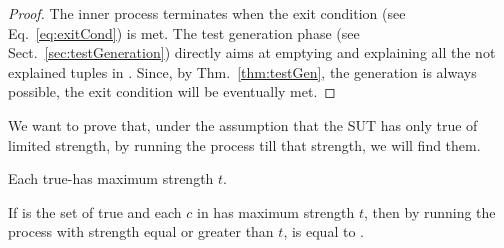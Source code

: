 \begin{tikzborder}{\cite{Gargantini16:validation}}
\begin{tikzborder}{\cite{gargantini_combinatorial_2017}}
\begin{tikzborder}{\cite{gargantini_combinatorial_2017}}
\begin{tikzborder}{\cite{garn2019}}
\begin{tikzborder}{\cite{arcaini2019achieving}}
\begin{tikzborder}{}
\begin{proof}
	The inner process \mixt terminates when the exit condition (see Eq.~\ref{eq:exitCond}) is met. The test generation phase (see Sect.~\ref{sec:testGeneration}) directly aims at emptying \ut and explaining all the not explained tuples in \ft. Since, by Thm.~\ref{thm:testGen}, the generation is always possible, the exit condition will be eventually met.
\end{proof}

We want to prove that, under the assumption that the SUT has only true \mfics of limited strength, by running the process till that strength, we will find them.

\begin{assumption}\label{assu:maxStrength}
	Each true-\mfic has maximum strength $t$.
\end{assumption}

\begin{thm}\label{thm:trueMficsFound}
	If \trueMficsSet is the set of true \mfics and each $c$ in \trueMficsSet has maximum strength $t$, then by running the process with strength equal or greater than $t$, \isoMficsSet is equal to \trueMficsSet.
\end{thm}


\end{tikzborder}
\end{tikzborder}
\end{tikzborder}
\end{tikzborder}
\end{tikzborder}
\end{tikzborder}
